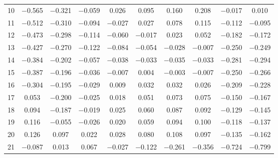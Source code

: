 \begin{table}[htpb]
\begin{tabular}{cccccccccc}
\num{10} & \num{-0.565} & \num{-0.321} & \num{-0.059} & \num{0.026} & \num{0.095} & \num{0.160} & \num{0.208} & \num{-0.017} & \num{0.010} \\
\num{11} & \num{-0.512} & \num{-0.310} & \num{-0.094} & \num{-0.027} & \num{0.027} & \num{0.078} & \num{0.115} & \num{-0.112} & \num{-0.095} \\
\num{12} & \num{-0.473} & \num{-0.298} & \num{-0.114} & \num{-0.060} & \num{-0.017} & \num{0.023} & \num{0.052} & \num{-0.182} & \num{-0.172} \\
\num{13} & \num{-0.427} & \num{-0.270} & \num{-0.122} & \num{-0.084} & \num{-0.054} & \num{-0.028} & \num{-0.007} & \num{-0.250} & \num{-0.249} \\
\num{14} & \num{-0.384} & \num{-0.202} & \num{-0.057} & \num{-0.038} & \num{-0.033} & \num{-0.035} & \num{-0.033} & \num{-0.281} & \num{-0.294} \\
\num{15} & \num{-0.387} & \num{-0.196} & \num{-0.036} & \num{-0.007} & \num{0.004} & \num{-0.003} & \num{-0.007} & \num{-0.250} & \num{-0.266} \\
\num{16} & \num{-0.304} & \num{-0.195} & \num{-0.029} & \num{0.009} & \num{0.032} & \num{0.032} & \num{0.026} & \num{-0.209} & \num{-0.228} \\
\num{17} & \num{0.053} & \num{-0.200} & \num{-0.025} & \num{0.018} & \num{0.051} & \num{0.073} & \num{0.075} & \num{-0.150} & \num{-0.167} \\
\num{18} & \num{0.094} & \num{-0.187} & \num{-0.019} & \num{0.025} & \num{0.060} & \num{0.087} & \num{0.092} & \num{-0.129} & \num{-0.145} \\
\num{19} & \num{0.116} & \num{-0.055} & \num{-0.026} & \num{0.020} & \num{0.059} & \num{0.094} & \num{0.100} & \num{-0.118} & \num{-0.137} \\
\num{20} & \num{0.126} & \num{0.097} & \num{0.022} & \num{0.028} & \num{0.080} & \num{0.108} & \num{0.097} & \num{-0.135} & \num{-0.162} \\
\num{21} & \num{-0.087} & \num{0.013} & \num{0.067} & \num{-0.027} & \num{-0.122} & \num{-0.261} & \num{-0.356} & \num{-0.724} & \num{-0.799} \\
        \bottomrule
    \end{tabular}
\end{table}

